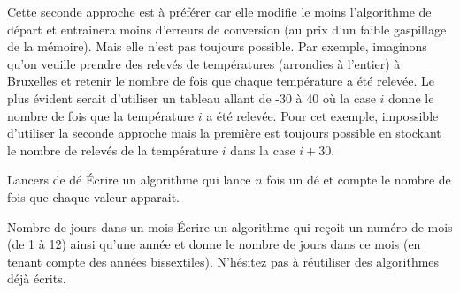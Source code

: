 		Cette seconde approche est à préférer 
		car elle modifie le moins l’algorithme de départ 
		et entrainera moins d’erreurs de conversion
		(au prix d’un faible gaspillage de la mémoire).
		Mais elle n’est pas toujours possible.
		Par exemple, imaginons qu’on veuille prendre 
		des relevés de températures (arrondies à l’entier) à Bruxelles 
		et retenir le nombre de fois que chaque température a été relevée.
		Le plus évident serait d’utiliser un tableau allant de -30 à 40
		où la case $i$ donne le nombre de fois 
		que la température $i$ a été relevée.
		Pour cet exemple, impossible d’utiliser la seconde approche
		mais la première est toujours possible en stockant
		le nombre de relevés de la température $i$ dans la case $i+30$.

		\begin{Exercice}{Lancers de dé}
			Écrire un algorithme qui lance $n$ fois un dé
			et compte le nombre de fois que chaque valeur apparait.
			\begin{LDA}
			\end{LDA}
		\end{Exercice}
		
		\begin{Exercice}{Nombre de jours dans un mois}
			Écrire un algorithme qui reçoit un numéro de mois (de 1 à 12)
			ainsi qu’une année et donne le nombre de jours dans ce mois
			(en tenant compte des années bissextiles).
			N’hésitez pas à réutiliser des algorithmes déjà écrits.
		\end{Exercice}
		
		
